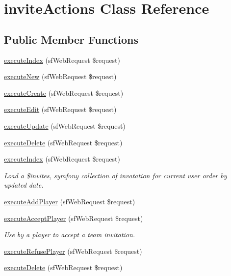 \hypertarget{classinvite_actions}{\section{invite\-Actions Class Reference}
\label{classinvite_actions}
}
\subsection*{Public Member Functions}
\begin{DoxyCompactItemize}
\item 
\hyperlink{classinvite_actions_a948cc911eb1d9f77990be54af3b2080f}{execute\-Index} (sf\-Web\-Request \$request)
\item 
\hyperlink{classinvite_actions_a0ffbea56560c6c633dae68ec22aff21c}{execute\-New} (sf\-Web\-Request \$request)
\item 
\hyperlink{classinvite_actions_a75837617743fb64dca82d8133b2c662a}{execute\-Create} (sf\-Web\-Request \$request)
\item 
\hyperlink{classinvite_actions_af4d8fedd4b28f3398826a1bb8fa54394}{execute\-Edit} (sf\-Web\-Request \$request)
\item 
\hyperlink{classinvite_actions_af7b4f51862add3c2ebb54efc136a0840}{execute\-Update} (sf\-Web\-Request \$request)
\item 
\hyperlink{classinvite_actions_a52b5b11b11a0070dd2662257520c045a}{execute\-Delete} (sf\-Web\-Request \$request)
\item 
\hyperlink{classinvite_actions_a948cc911eb1d9f77990be54af3b2080f}{execute\-Index} (sf\-Web\-Request \$request)
\begin{DoxyCompactList}\small\item\em Load a \$invites, symfony collection of invatation for current user order by updated date. \end{DoxyCompactList}\item 
\hyperlink{classinvite_actions_ac96e7470fe70ab40f49b5f9e4543c662}{execute\-Add\-Player} (sf\-Web\-Request \$request)
\item 
\hyperlink{classinvite_actions_a0d27c39ed6dd0446b8ebe17df7ee16f4}{execute\-Accept\-Player} (sf\-Web\-Request \$request)
\begin{DoxyCompactList}\small\item\em Use by a player to accept a team invitation. \end{DoxyCompactList}\item 
\hyperlink{classinvite_actions_a3a81f526103730495ad97c343ebfc8d1}{execute\-Refuse\-Player} (sf\-Web\-Request \$request)
\item 
\hyperlink{classinvite_actions_a52b5b11b11a0070dd2662257520c045a}{execute\-Delete} (sf\-Web\-Request \$request)
\end{DoxyCompactItemize}
